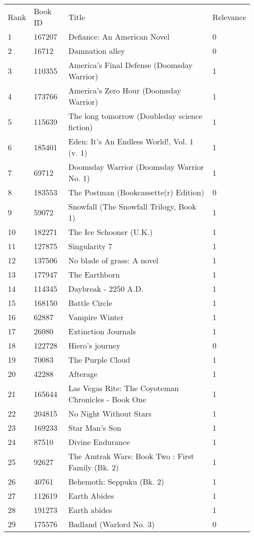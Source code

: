 \begin{tabular}{llll}
\toprule
\midrule
Rank & Book ID & Title & Relevance \\
1 & 167207 & Defiance: An American Novel & 0 \\
2 & 16712 & Damnation alley & 0 \\
3 & 110355 & America's Final Defense (Doomsday Warrior) & 1 \\
4 & 173766 & America's Zero Hour (Doomsday Warrior) & 1 \\
5 & 115639 & The long tomorrow (Doubleday science fiction) & 1 \\
6 & 185401 & Eden: It's An Endless World!, Vol. 1 (v. 1) & 1 \\
7 & 69712 & Doomsday Warrior (Doomsday Warrior No. 1) & 1 \\
8 & 183553 & The Postman (Bookcassette(r) Edition) & 0 \\
9 & 59072 & Snowfall (The Snowfall Trilogy, Book 1) & 1 \\
10 & 182271 & The Ice Schooner (U.K.) & 1 \\
11 & 127875 & Singularity 7 & 1 \\
12 & 137506 & No blade of grass: A novel & 1 \\
13 & 177947 & The Earthborn & 1 \\
14 & 114345 & Daybreak - 2250 A.D. & 1 \\
15 & 168150 & Battle Circle & 1 \\
16 & 62887 & Vampire Winter & 1 \\
17 & 26080 & Extinction Journals & 1 \\
18 & 122728 & Hiero's journey & 0 \\
19 & 70083 & The Purple Cloud & 1 \\
20 & 42288 & Afterage & 1 \\
21 & 165644 & Las Vegas Rite: The Coyoteman Chronicles - Book One & 1 \\
22 & 204815 & No Night Without Stars & 1 \\
23 & 169233 & Star Man's Son & 1 \\
24 & 87510 & Divine Endurance & 1 \\
25 & 92627 & The Amtrak Wars: Book Two : First Family (Bk. 2) & 1 \\
26 & 40761 & Behemoth: Seppuku (Bk. 2) & 1 \\
27 & 112619 & Earth Abides & 1 \\
28 & 191273 & Earth abides & 1 \\
29 & 175576 & Badland (Warlord No. 3) & 0 \\

\end{tabular}
